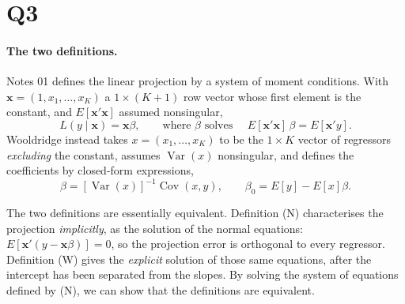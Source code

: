 \documentclass[11pt]{article}
\DeclareMathOperator{\Var}{Var}
\DeclareMathOperator{\Cov}{Cov}
\begin{document}
\section{Q3}
\label{sec:q3}

\paragraph{The two definitions.}
Notes 01 defines the linear projection by a system of moment conditions. With
$\mathbf{x} = (1,x_1,\dots,x_K)$ a $1\times(K+1)$ row vector whose first element
is the constant, and $E[\mathbf{x}'\mathbf{x}]$ assumed nonsingular,
\begin{equation*}
L(y\mid \mathbf{x}) = \mathbf{x}\beta,
\qquad\text{where }\beta\text{ solves }\quad
E[\mathbf{x}'\mathbf{x}]\,\beta = E[\mathbf{x}'y].
\tag{N}
\end{equation*}
Wooldridge instead takes $x = (x_1,\dots,x_K)$ to be the $1\times K$ vector of
regressors \emph{excluding} the constant, assumes $\Var(x)$ nonsingular, and
defines the coefficients by closed-form expressions,
\begin{equation*}
\beta = \left[\Var(x)\right]^{-1}\Cov(x,y),
\qquad
\beta_0 = E[y] - E[x]\beta .
\tag{W}
\end{equation*}

The two definitions are essentially equivalent. Definition (N)
characterises the projection \emph{implicitly}, as the solution of the normal
equations: $E[\mathbf{x}'(y - \mathbf{x}\beta)] = 0$, so the
projection error is orthogonal to every regressor. Definition (W) gives the
\emph{explicit} solution of those same equations, after the intercept has been
separated from the slopes. By solving the system of equations defined by (N), we can show that the definitions are equivalent. 
\end{document}
